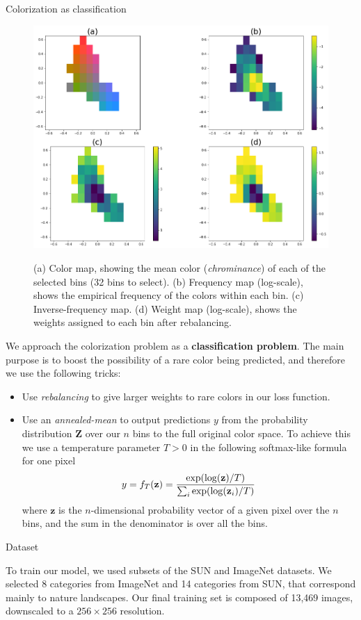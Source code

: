 \documentclass[final]{beamer}
\newlength{\onecolwid}
\begin{document}
\begin{frame}[t]
\begin{columns}[t]
\begin{column}{\onecolwid}
\begin{block}{Colorization as classification}
  \begin{figure}
  \begin{center}
  \includegraphics[width=.5\linewidth]{cdexample}\label{colormap}
  \caption{ (a) Color map, showing the mean color (\textit{chrominance}) of each of the selected bins (32 bins to select). (b) Frequency map (log-scale), shows the empirical frequency of the colors within each bin. (c) Inverse-frequency map. (d) Weight map (log-scale), shows the weights assigned to each bin after rebalancing.}
  \end{center}
  \end{figure}

We approach the colorization problem as a \textbf{classification problem}. The main purpose is to boost the possibility of a rare color being predicted, and therefore we use the following tricks:
\begin{itemize}
\item Use \textit{rebalancing} to give larger weights to rare colors in our loss function.
\item Use an \textit{annealed-mean} to output predictions $y$ from the probability distribution $\textbf{Z}$ over our $n$ bins to the full original color space. To achieve this we use a temperature parameter $T > 0$ in the following softmax-like formula for one pixel $$y = f_T(\textbf{z}) = {\exp(\log(\textbf{z}) / T) \over \sum_i \exp(\log(\textbf{z}_i) / T)}$$ where $\textbf{z}$ is the $n$-dimensional probability vector of a given pixel over the $n$ bins, and the sum in the denominator is over all the bins.
\end{itemize}




\end{block}

\begin{block}{Dataset}

To train our model, we used subsets of the SUN and ImageNet datasets. We selected 8 categories from ImageNet and 14 categories from SUN, that correspond mainly to nature landscapes. Our final training set is composed of 13,469 images, downscaled to a $256\times 256$ resolution.


\end{block}
\end{column}
\end{columns}
\end{frame}
\end{document}
